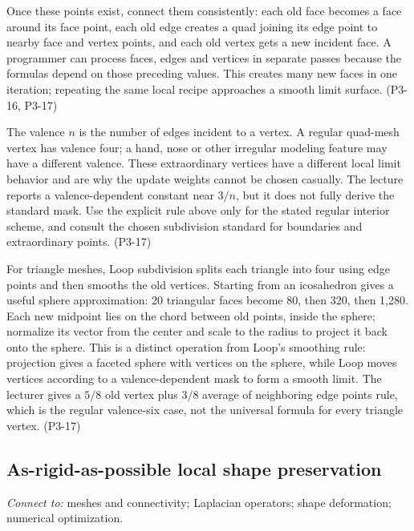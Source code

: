 Once these points exist, connect them consistently: each old face becomes a face around its face point, each old edge creates a quad joining its edge point to nearby face and vertex points, and each old vertex gets a new incident face. A programmer can process faces, edges and vertices in separate passes because the formulas depend on those preceding values. This creates many new faces in one iteration; repeating the same local recipe approaches a smooth limit surface. (P3-16, P3-17)

The valence \(n\) is the number of edges incident to a vertex. A regular quad-mesh vertex has valence four; a hand, nose or other irregular modeling feature may have a different valence. These extraordinary vertices have a different local limit behavior and are why the update weights cannot be chosen casually. The lecture reports a valence-dependent constant near \(3/n\), but it does not fully derive the standard mask. Use the explicit rule above only for the stated regular interior scheme, and consult the chosen subdivision standard for boundaries and extraordinary points. (P3-17)

For triangle meshes, Loop subdivision splits each triangle into four using edge points and then smooths the old vertices. Starting from an icosahedron gives a useful sphere approximation: 20 triangular faces become 80, then 320, then 1,280. Each new midpoint lies on the chord between old points, inside the sphere; normalize its vector from the center and scale to the radius to project it back onto the sphere. This is a distinct operation from Loop's smoothing rule: projection gives a faceted sphere with vertices on the sphere, while Loop moves vertices according to a valence-dependent mask to form a smooth limit. The lecturer gives a \(5/8\) old vertex plus \(3/8\) average of neighboring edge points rule, which is the regular valence-six case, not the universal formula for every triangle vertex. (P3-17)

\subsection{As-rigid-as-possible local shape preservation}\label{03-visual-computing-i-ch002-as-rigid-as-possible-local-shape-preservation}

\hypertarget{03-visual-computing-i-ch002-as-rigid-as-possible-local-shape-preservation}{}

\emph{Connect to:} meshes and connectivity; Laplacian operators; shape deformation; numerical optimization.

